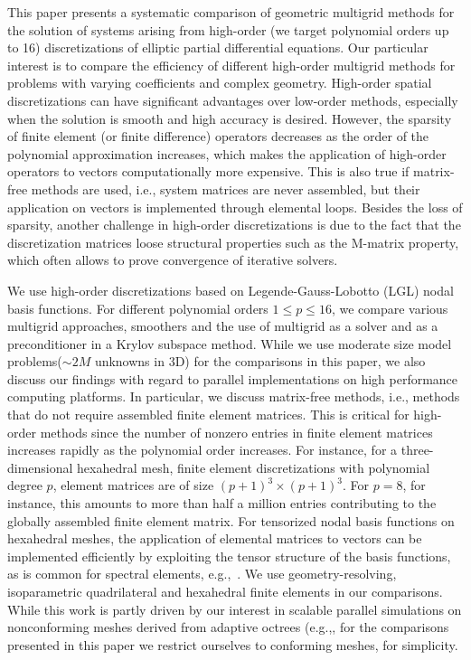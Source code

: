 \documentclass[smallcondensed,final]{svjour3}     %
\begin{document}
This paper presents a systematic comparison of geometric multigrid methods for
the solution of systems arising from high-order (we target polynomial orders up
to 16) discretizations of elliptic partial differential equations. Our
particular interest is to compare the efficiency of different high-order
multigrid methods for problems with varying coefficients and complex geometry.
High-order spatial discretizations can have significant advantages over
low-order methods, especially when the solution is smooth and high accuracy is
desired. However, the sparsity of finite element (or finite difference)
operators decreases as the order of the polynomial approximation increases,
which makes the application of high-order operators to vectors computationally
more expensive. This is also true if matrix-free methods are used, i.e., system
matrices are never assembled, but their application on vectors is implemented
through elemental loops.  Besides the loss of sparsity, another challenge in
high-order discretizations is due to the fact that the discretization matrices
loose structural properties such as the M-matrix property, which often allows
to prove convergence of iterative solvers.

We use high-order discretizations based on Legende-Gauss-Lobotto (LGL) nodal
basis functions. For different polynomial orders $1\le p\le 16$, we compare
various multigrid approaches, smoothers and the use of multigrid as a solver
and as a preconditioner in a Krylov subspace method.  While we use moderate
size model problems($\sim 2M$ unknowns in 3D) for the comparisons in this
paper, we also discuss our findings with regard to parallel implementations on
high performance computing platforms.  In particular, we discuss matrix-free
methods, i.e., methods that do not require assembled finite element matrices.
This is critical for high-order methods since the number of nonzero entries in
finite element matrices increases rapidly as the polynomial order increases.
For instance, for a three-dimensional hexahedral mesh, finite element
discretizations with polynomial degree $p$, element matrices are of size
$(p+1)^3\times (p+1)^3$. For $p=8$, for instance, this amounts to more than
half a million entries contributing to the globally assembled finite element
matrix.  For tensorized nodal basis functions on hexahedral meshes, the
application of elemental matrices to vectors can be implemented efficiently by
exploiting the tensor structure of the basis functions, as is common for
spectral elements, e.g.,~\cite{DevilleFischerMund02}. We use
geometry-resolving, isoparametric quadrilateral and hexahedral finite elements
in our comparisons. While this work is partly driven by our interest in
scalable parallel simulations on nonconforming meshes derived from adaptive
octrees (e.g.,\cite{SundarBirosBursteddeEtAl12, SampathBiros10,
BursteddeGhattasGurnisEtAl10}, for the comparisons presented in this paper we
restrict ourselves to conforming meshes, for simplicity.
\end{document}
